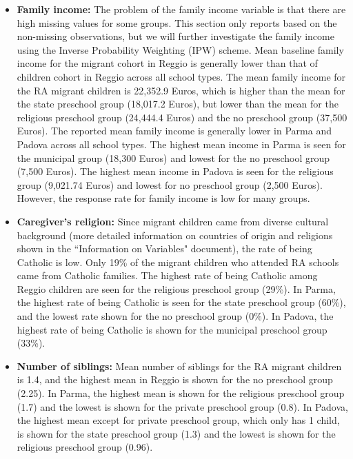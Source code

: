 \documentclass[12pt]{article}
\begin{document}
\begin{itemize}
\item \textbf{Family income:} The problem of the family income variable is that there are high missing values for some groups. This section only reports based on the non-missing observations, but we will further investigate the family income using the Inverse Probability Weighting (IPW) scheme. Mean baseline family income for the migrant cohort in Reggio is generally lower than that of children cohort in Reggio across all school types. The mean family income for the RA migrant children is 22,352.9 Euros, which is higher than the mean for the state preschool group (18,017.2 Euros), but lower than the mean for the religious preschool group (24,444.4 Euros) and the no preschool group (37,500 Euros). The reported mean family income is generally lower in Parma and Padova across all school types. The highest mean income in Parma is seen for the municipal group (18,300 Euros) and lowest for the no preschool group (7,500 Euros). The highest mean income in Padova is seen for the religious group (9,021.74 Euros) and lowest for no preschool group (2,500 Euros). However, the response rate for family income is low for many groups. 

\item \textbf{Caregiver's religion:} Since migrant children came from diverse cultural background (more detailed information on countries of origin and religions shown in the ``Information on Variables" document), the rate of being Catholic is low. Only 19\% of the migrant children who attended RA schools came from Catholic families. The highest rate of being Catholic among Reggio children are seen for the religious preschool group (29\%). In Parma, the highest rate of being Catholic is seen for the state preschool group (60\%), and the lowest rate shown for the no preschool group (0\%). In Padova, the highest rate of being Catholic is shown for the municipal preschool group (33\%). 

\item \textbf{Number of siblings:} Mean number of siblings for the RA migrant children is 1.4, and the highest mean in Reggio is shown for the no preschool group (2.25). In Parma, the highest mean is shown for the religious preschool group (1.7) and the lowest is shown for the private preschool group (0.8). In Padova, the highest mean except for private preschool group, which only has 1 child, is shown for the state preschool group (1.3) and the lowest is shown for the religious preschool group (0.96). 
\end{itemize}
\end{document}
